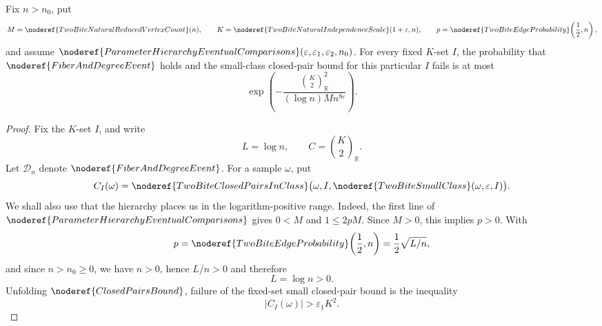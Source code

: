 \begin{lemma}
Fix \(n>n_0\), put
\[
M=\noderef{TwoBiteNaturalReducedVertexCount}(n),\qquad
K=\noderef{TwoBiteNaturalIndependenceScale}(1+\varepsilon,n),
\qquad
p=\noderef{TwoBiteEdgeProbability}\!\left(\frac12,n\right),
\]
and assume
\(\noderef{ParameterHierarchyEventualComparisons}
(\varepsilon,\varepsilon_1,\varepsilon_2,n_0)\).
For every fixed \(K\)-set \(I\), the probability that
\(\noderef{FiberAndDegreeEvent}\) holds and the small-class closed-pair bound
for this particular \(I\) fails is at most
\[
\exp\!\left(
-\frac{\binom{K}{2}_{\mathbb R}^2}
 {(\log n)M n^{8\varepsilon}}
\right).
\]
\end{lemma}
\begin{proof}
Fix the \(K\)-set \(I\), and write
\[
L=\log n,\qquad
C=\binom{K}{2}_{\mathbb R}.
\]
Let \(\mathcal D_n\) denote \(\noderef{FiberAndDegreeEvent}\).  For a sample
\(\omega\), put
\[
C_I(\omega)=\noderef{TwoBiteClosedPairsInClass}
  \bigl(\omega,I,\noderef{TwoBiteSmallClass}(\omega,\varepsilon,I)\bigr).
\]
We shall also use that the hierarchy places us in the logarithm-positive
range.  Indeed, the first line of
\(\noderef{ParameterHierarchyEventualComparisons}\) gives \(0<M\) and
\(1\le2pM\).  Since \(M>0\), this implies \(p>0\).  With
\[
p=\noderef{TwoBiteEdgeProbability}\!\left(\frac12,n\right)
 =\frac12\sqrt{L/n},
\]
and since \(n>n_0\ge0\), we have \(n>0\), hence \(L/n>0\) and therefore
\[
L=\log n>0. \tag{0}
\]
Unfolding \(\noderef{ClosedPairsBound}\), failure of the fixed-set small
closed-pair bound is the inequality
\[
|C_I(\omega)|>\varepsilon_1K^2. \tag{1}
\]


\end{proof}
